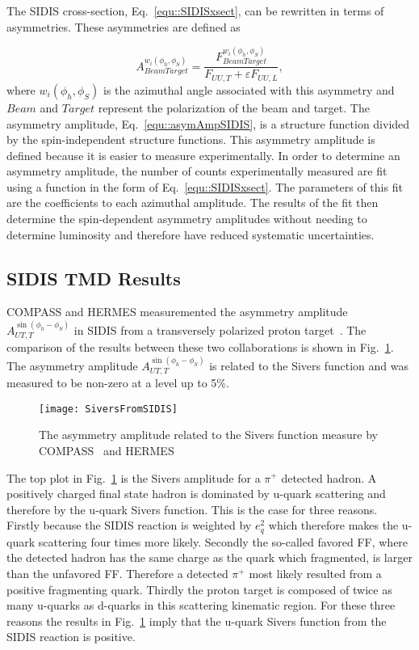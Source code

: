 The SIDIS cross-section, Eq.~\ref{equ::SIDISxsect}, can be rewritten in terms of
asymmetries.  These asymmetries are defined as

\begin{equation}
  A^{w_i(\phi_h, \phi_S)}_{BeamTarget} = \frac{F^{w_i(\phi_h,
      \phi_S)}_{BeamTarget}}{F_{UU,T}+\varepsilon F_{UU,L}},
  \label{equ::asymAmpSIDIS}
\end{equation}
\noindent
where $w_i(\phi_h, \phi_S)$ is the azimuthal angle associated with this
asymmetry and $Beam$ and $Target$ represent the polarization of the beam and
target.  The asymmetry amplitude, Eq.~\ref{equ::asymAmpSIDIS}, is a structure
function divided by the spin-independent structure functions.  This asymmetry
amplitude is defined because it is easier to measure experimentally.
In order to determine an asymmetry amplitude, the number of counts
experimentally measured are fit using a function in the form of
Eq.~\ref{equ::SIDISxsect}.  The parameters of this fit are the coefficients to
each azimuthal amplitude.  The results of the fit then determine the
spin-dependent asymmetry amplitudes without needing to determine luminosity and
therefore have reduced systematic uncertainties.

\subsection{SIDIS TMD Results}
COMPASS and HERMES measuremented the asymmetry amplitude $A_{UT
  ,T}^{\sin\left(\phi_h -\phi_S\right)}$ in SIDIS from a transversely polarized
proton target~\cite{Alekseev:2008aa,Airapetian:2009ae}.  The comparison of the
results between these two collaborations is shown in
Fig.~\ref{fig::SiversFromSIDIS}.  The asymmetry amplitude $A_{UT
  ,T}^{\sin\left(\phi_h-\phi_S\right)}$ is related to the Sivers function and
was measured to be non-zero at a level up to 5\%.

\begin{figure}[h!t]
  \centering \texttt{[image: SiversFromSIDIS]}
  \caption{The asymmetry amplitude related to the Sivers function measure by
    COMPASS~\cite{Alekseev:2008aa} and HERMES~\cite{Airapetian:2009ae}}
  \label{fig::SiversFromSIDIS}
\end{figure}

The top plot in Fig.~\ref{fig::SiversFromSIDIS} is the Sivers amplitude for a
$\pi^+$ detected hadron.  A positively charged final state hadron is dominated
by u-quark scattering and therefore by the u-quark Sivers function.  This is the
case for three reasons.  Firstly because the SIDIS reaction is weighted by
$e_q^2$ which therefore makes the u-quark scattering four times more likely.
Secondly the so-called favored FF, where the detected hadron has the same charge
as the quark which fragmented, is larger than the unfavored FF.  Therefore a
detected $\pi^+$ most likely resulted from a positive fragmenting quark.
Thirdly the proton target is composed of twice as many u-quarks as d-quarks in
this scattering kinematic region.  For these three reasons the results in
Fig.~\ref{fig::SiversFromSIDIS} imply that the u-quark Sivers function from the
SIDIS reaction is positive.

